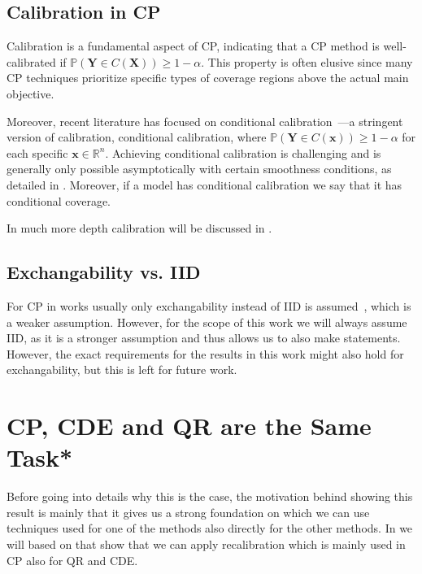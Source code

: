 \subsection{Calibration in CP}\label{sec:calibration_cp}

Calibration is a fundamental aspect of CP, indicating that a CP method is well-calibrated if $\mathbb{P}(\mathbf{Y} \in C(\mathbf{X})) \geq 1 - \alpha$. This property is often elusive since many CP techniques prioritize specific types of coverage regions above the actual main objective.

Moreover, recent literature has focused on conditional calibration~\cite{sesia2021conformal,izbicki2022cd,izbicki2019flexible,chernozhukov2021distributional}—a stringent version of calibration, conditional calibration, where $\mathbb{P}(\mathbf{Y} \in C(\mathbf{x})) \geq 1 - \alpha$ for each specific $\mathbf{x} \in \mathbb{R}^n$. Achieving conditional calibration is challenging and is generally only possible asymptotically with certain smoothness conditions, as detailed in . Moreover, if a model has conditional calibration we say that it has conditional coverage.

In much more depth calibration will be discussed in .

\subsection{Exchangability vs. IID}

For CP in works usually only exchangability instead of IID is assumed~\cite{angelopoulos2021gentle}, which is a weaker assumption. However, for the scope of this work we will always assume IID, as it is a stronger assumption and thus allows us to also make statements. However, the exact requirements for the results in this work might also hold for exchangability, but this is left for future work.

\section{CP, CDE and QR are the Same Task*}\label{sec:cp_sub_cde}

Before going into details why this is the case, the motivation behind showing this result is mainly that it gives us a strong foundation on which we can use techniques used for one of the methods also directly for the other methods. In  we will based on that show that we can apply recalibration which is mainly used in CP also for QR and CDE.\@

